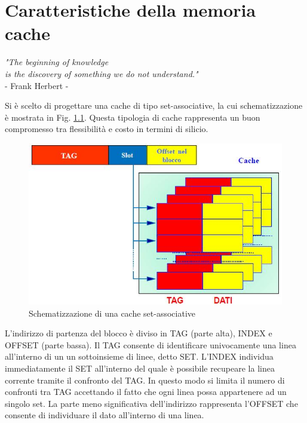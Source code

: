 \clearpage{\pagestyle{empty}\cleardoublepage}
\chapter{Caratteristiche della memoria cache}

\begin{flushright}\begin{small}\textit{"The beginning of knowledge\\
 is the discovery of something we do not understand."}\\
- Frank Herbert -\\
\end{small}\end{flushright}

Si \`e scelto di progettare una cache di tipo set-associative, la cui schematizzazione \`e mostrata in Fig. \ref{fig:set_ass}.
Questa tipologia di cache rappresenta un buon compromesso tra flessibilit\`a e costo in termini di silicio.

\begin{figure}[!h]
\centering
\includegraphics[width=\textwidth]{img/set-associative.jpg}
\caption{Schematizzazione di una cache set-associative}
\label{fig:set_ass}
\end{figure}


L'indirizzo di partenza del blocco \`e diviso in TAG (parte alta), INDEX e OFFSET (parte bassa).
Il TAG consente di identificare univocamente una linea all'interno di un un sottoinsieme di linee, detto SET.
L'INDEX individua immediatamente il SET all'interno del quale \`e possibile recupeare la linea corrente tramite il confronto del TAG.
In questo modo si limita il numero di confronti tra TAG accettando il fatto che ogni linea possa appartenere ad un singolo set.
La parte meno significativa dell'indirizzo rappresenta l'OFFSET che consente di individuare il dato all'interno di una linea.


